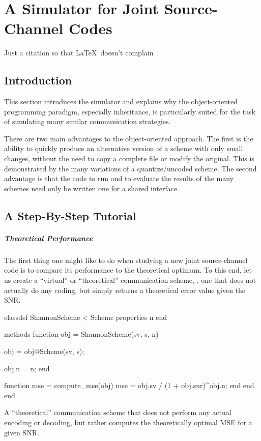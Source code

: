 \chapter{A Simulator for Joint Source-Channel Codes}%

\DefineShortVerb{\|}

Just a citation so that \LaTeX\ doesn't complain~\cite{KleinerR2009}.

\section{Introduction}

This section introduces the simulator and explains why the object-oriented
programming paradigm, especially inheritance, is particularly suited for the
task of simulating many similar communication strategies.

There are two main advantages to the object-oriented approach. The first is the
ability to quickly produce an alternative version of a scheme with only small
changes, without the need to copy a complete file or modify the original. This
is demonstrated by the many variations of a quantize/uncoded scheme. The second
advantage is that the code to run and to evaluate the results of the many
schemes need only be written one for a shared interface. 


\section{A Step-By-Step Tutorial}

\paragraph{Theoretical Performance}
The first thing one might like to do when studying a new joint source-channel
code is to compare its performance to the theoretical optimum. To this end,
let us create a ``virtual'' or ``theoretical'' communication scheme, \ie, one
that does not actually do any coding, but simply returns a theoretical error
value given the SNR.

\begin{listing}
\begin{Code}
  classdef ShannonScheme < Scheme
    properties
      n         %
    end

    methods
      function obj = ShannonScheme(sv, s, n)
        
        obj = obj@Scheme(sv, s);

        obj.n = n;
      end

      function mse = compute_mse(obj)
        mse = obj.sv / (1 + obj.snr)^obj.n;
      end
    end
  end
\end{Code}
  \caption{A ``theoretical'' communication scheme that does not perform any
  actual encoding or decoding, but rather computes the theoretically optimal MSE
  for a given SNR.}
  \label{lst:shannonscheme}
\end{listing}

